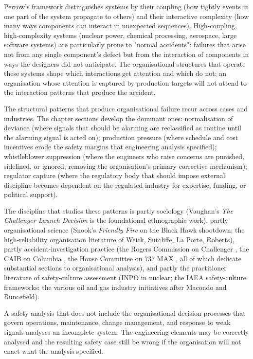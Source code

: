 Perrow's framework distinguishes systems by their coupling (how tightly events in one part of the system propagate to others) and their interactive complexity (how many ways components can interact in unexpected sequences). High-coupling, high-complexity systems (nuclear power, chemical processing, aerospace, large software systems) are particularly prone to "normal accidents": failures that arise not from any single component's defect but from the interaction of components in ways the designers did not anticipate. The organisational structures that operate these systems shape which interactions get attention and which do not; an organisation whose attention is captured by production targets will not attend to the interaction patterns that produce the accident.

The structural patterns that produce organisational failure recur across cases and industries. The chapter sections develop the dominant ones: normalisation of deviance (where signals that should be alarming are reclassified as routine until the alarming signal is acted on); production pressure (where schedule and cost incentives erode the safety margins that engineering analysis specified); whistleblower suppression (where the engineers who raise concerns are punished, sidelined, or ignored, removing the organisation's primary corrective mechanism); regulator capture (where the regulatory body that should impose external discipline becomes dependent on the regulated industry for expertise, funding, or political support).

The discipline that studies these patterns is partly sociology (Vaughan's \emph{The Challenger Launch Decision} \cite{hist:vaughan1996} is the foundational ethnographic work), partly organisational science (Snook's \emph{Friendly Fire} on the Black Hawk shootdown; the high-reliability organisation literature of Weick, Sutcliffe, La Porte, Roberts), partly accident-investigation practice (the Rogers Commission on Challenger \cite{acc:nasa-challenger}, the CAIB on Columbia \cite{acc:caib-columbia}, the House Committee on 737 MAX \cite{acc:house-737max-2020}, all of which dedicate substantial sections to organisational analysis), and partly the practitioner literature of safety-culture assessment (INPO in nuclear; the IAEA safety-culture frameworks; the various oil and gas industry initiatives after Macondo and Buncefield).

\begin{principle}
A safety analysis that does not include the organisational decision processes that govern operations, maintenance, change management, and response to weak signals analyses an incomplete system. The engineering elements may be correctly analysed and the resulting safety case still be wrong if the organisation will not enact what the analysis specified.
\end{principle}

